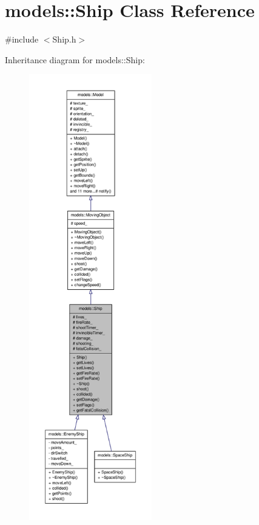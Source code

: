 \hypertarget{classmodels_1_1Ship}{\section{models\-:\-:\-Ship \-Class \-Reference}
\label{d0/d37/classmodels_1_1Ship}
}


{\ttfamily \#include $<$\-Ship.\-h$>$}



\-Inheritance diagram for models\-:\-:\-Ship\-:
\nopagebreak
\begin{figure}[H]
\begin{center}
\leavevmode
\includegraphics[height=550pt]{d9/d8d/classmodels_1_1Ship__inherit__graph}
\end{center}
\end{figure}


